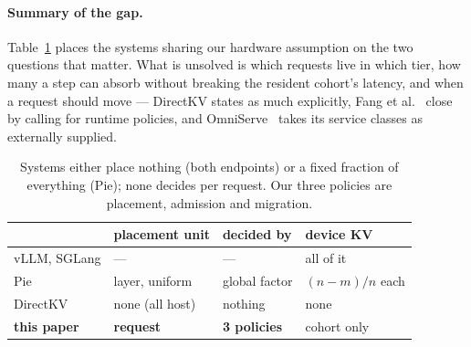 \paragraph{Summary of the gap.} Table~\ref{tab:axes} places the systems sharing our
hardware assumption on the two questions that matter. What is unsolved is which
requests live in which tier, how many a step can absorb without breaking the resident
cohort's latency, and when a request should move --- DirectKV states as much
explicitly, Fang et al.~\cite{calkv} close by calling for runtime policies, and
OmniServe~\cite{omniserve} takes its service classes as externally supplied.

\begin{table}[t]
\centering
\footnotesize
\setlength{\tabcolsep}{4pt}
\begin{tabular}{@{}llll@{}}
\toprule
 & placement unit & decided by & device KV \\
\midrule
vLLM, SGLang & --- & --- & all of it \\
Pie~\cite{pie} & layer, uniform & global factor & $(n{-}m)/n$ each \\
DirectKV~\cite{directkv} & none (all host) & nothing & none \\
\textbf{this paper} & \textbf{request} & \textbf{3 policies} & cohort only \\
\bottomrule
\end{tabular}
\caption{Systems either place nothing (both endpoints) or a fixed fraction of
everything (Pie); none decides per request. Our three policies are placement,
admission and migration.}
\label{tab:axes}
\end{table}
